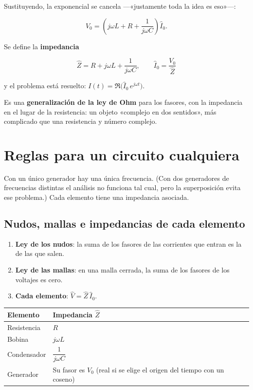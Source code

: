 \documentclass[12pt,a4paper]{article}
\begin{document}
Sustituyendo, la exponencial se cancela ---«justamente toda la idea es eso»---:

\[
V_0 = \left(j\omega L + R + \frac{1}{j\omega C}\right)\hat I_0 .
\]

Se define la \textbf{impedancia}

\begin{keybox}
\[
\boxed{\ \hat Z = R + j\omega L + \frac{1}{j\omega C},
\qquad
\hat I_0 = \frac{V_0}{\hat Z}\ }
\]
\end{keybox}
y el problema está resuelto: $I(t) = \Re\big(\hat I_0\,e^{j\omega t}\big)$.

Es una \textbf{generalización de la ley de Ohm} para los fasores, con la impedancia
en el lugar de la resistencia: un objeto «complejo en dos sentidos», más
complicado que una resistencia y número complejo.

\section{Reglas para un circuito cualquiera}

Con un único generador hay una única frecuencia. (Con dos generadores de
frecuencias distintas el análisis no funciona tal cual, pero la superposición
evita ese problema.) Cada elemento tiene una impedancia asociada.

\subsection{Nudos, mallas e impedancias de cada elemento}

\begin{enumerate}
  \item \textbf{Ley de los nudos}: la suma de los fasores de las corrientes que entran es
  la de las que salen.
  \item \textbf{Ley de las mallas}: en una malla cerrada, la suma de los fasores de los
  voltajes es cero.
  \item \textbf{Cada elemento}: $\hat V = \hat Z\,\hat I_0$.
\end{enumerate}

\begin{center}
\renewcommand{\arraystretch}{1.35}
\small
\begin{tabularx}{\textwidth}{l>{\raggedright\arraybackslash}X}
\toprule
\textbf{Elemento} & \textbf{Impedancia $\hat Z$} \\
\midrule
Resistencia & $R$ \\
Bobina & $j\omega L$ \\
Condensador & $\dfrac{1}{j\omega C}$ \\
Generador & Su fasor es $V_0$ (real si se elige el origen del tiempo con un coseno) \\
\bottomrule
\end{tabularx}
\end{center}
\end{document}
